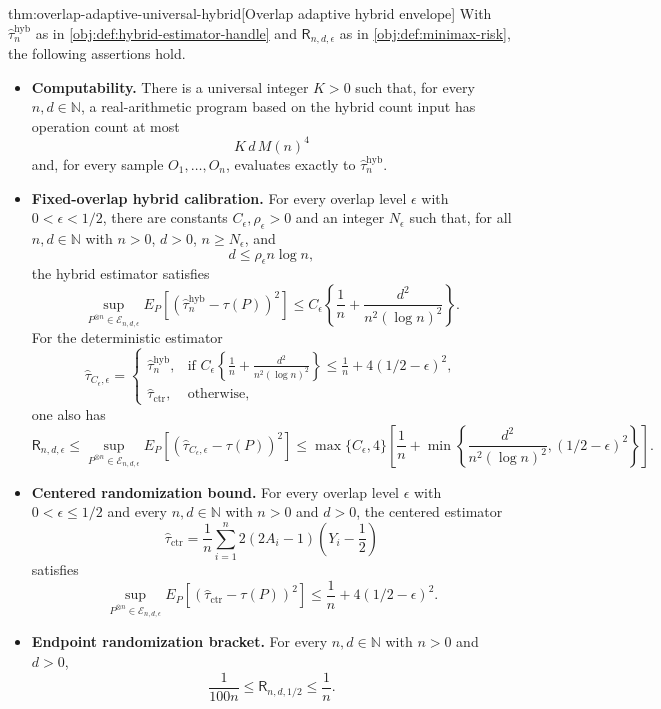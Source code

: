 \documentclass[11pt]{article}
\begin{document}
\begin{theoremv}{thm:overlap-adaptive-universal-hybrid}[Overlap adaptive hybrid envelope]
With \(\widehat\tau_n^{\mathrm{hyb}}\) as in \cref{obj:def:hybrid-estimator-handle} and \(\mathsf R_{n,d,\epsilon}\) as in \cref{obj:def:minimax-risk}, the following assertions hold.
\begin{itemize}
\item \textbf{Computability.} There is a universal integer \(K>0\) such that, for every \(n,d\in\mathbb N\), a real-arithmetic program based on the hybrid count input has operation count at most
\[
K\,d\,M(n)^4
\]
and, for every sample \(O_1,\ldots,O_n\), evaluates exactly to \(\widehat\tau_n^{\mathrm{hyb}}\).
\item \textbf{Fixed-overlap hybrid calibration.} For every overlap level \(\epsilon\) with \(0<\epsilon<1/2\), there are constants \(C_\epsilon,\rho_\epsilon>0\) and an integer \(N_\epsilon\) such that, for all \(n,d\in\mathbb N\) with \(n>0\), \(d>0\), \(n\ge N_\epsilon\), and
\[
d\le \rho_\epsilon n\log n,
\]
the hybrid estimator satisfies
\[
\sup_{P^{\otimes n}\in\mathcal E_{n,d,\epsilon}}
E_P\!\left[\left(\widehat\tau_n^{\mathrm{hyb}}-\tau(P)\right)^2\right]
\le
C_\epsilon\left\{\frac1n+\frac{d^2}{n^2(\log n)^2}\right\}.
\]
For the deterministic estimator
\[
\widehat\tau_{C_\epsilon,\epsilon}
=
\begin{cases}
\widehat\tau_n^{\mathrm{hyb}},
& \text{if } C_\epsilon\left\{\frac1n+\frac{d^2}{n^2(\log n)^2}\right\}
\le \frac1n+4(1/2-\epsilon)^2,\\
\widehat\tau_{\mathrm{ctr}},
& \text{otherwise,}
\end{cases}
\]
one also has
\[
\mathsf R_{n,d,\epsilon}
\le
\sup_{P^{\otimes n}\in\mathcal E_{n,d,\epsilon}}
E_P\!\left[\left(\widehat\tau_{C_\epsilon,\epsilon}-\tau(P)\right)^2\right]
\le
\max\{C_\epsilon,4\}
\left[
\frac1n+
\min\left\{
\frac{d^2}{n^2(\log n)^2},(1/2-\epsilon)^2
\right\}
\right].
\]
\item \textbf{Centered randomization bound.} For every overlap level \(\epsilon\) with \(0<\epsilon\le 1/2\) and every \(n,d\in\mathbb N\) with \(n>0\) and \(d>0\), the centered estimator
\[
\widehat\tau_{\mathrm{ctr}}
=
\frac1n\sum_{i=1}^n
2(2A_i-1)\left(Y_i-\frac12\right)
\]
satisfies
\[
\sup_{P^{\otimes n}\in\mathcal E_{n,d,\epsilon}}
E_P\!\left[\left(\widehat\tau_{\mathrm{ctr}}-\tau(P)\right)^2\right]
\le
\frac1n+4(1/2-\epsilon)^2.
\]
\item \textbf{Endpoint randomization bracket.} For every \(n,d\in\mathbb N\) with \(n>0\) and \(d>0\),
\[
\frac{1}{100n}\le \mathsf R_{n,d,1/2}\le \frac1n.
\]
\end{itemize}
\end{theoremv}
\end{document}
